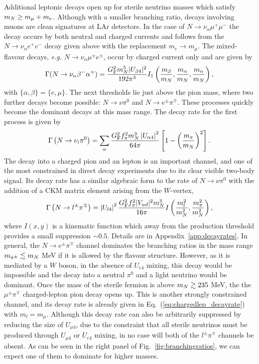 \documentclass[11pt, a4paper]{article}
\newcommand{\refeq}[1]{Eq.~(\ref{#1})}
\newcommand{\reffig}[1]{Fig.~\ref{#1}}
\newcommand{\refapp}[1]{Appendix~\ref{#1}}
\def\ster{\ensuremath N}
\begin{document}
Additional leptonic decays open up for sterile neutrino masses which satisfy
$m_\ster \geq m_\mu+m_e$. Although with a smaller branching ratio, decays
involving muons are clean signatures at LAr detectors. In the case of
$N\rightarrow \nu_\alpha \mu^+ \mu^-$ the decay occurs by both neutral and
charged currents and follows from the $N\rightarrow \nu_\alpha e^+ e^-$ decay
given above with the replacement $m_e \rightarrow m_\mu$.  The mixed-flavour
decays, \emph{e.g.} $N\rightarrow \nu_\alpha \mu^\pm e^\pm$, occur by charged
current only and are given by 
%
\[ \Gamma(\ster\to\nu_{\alpha} \beta^- \alpha^+) = \frac{G_\text{F}^2m_\ster^5
|U_{\beta 4}|^2}{192 \pi^3} I_1\left(\frac{m_\beta}{m_N},\frac{ m_\alpha}{m_N},
\frac{ m_\alpha}{m_N} \right) , \] 
%
with $\{\alpha,\beta\} = \{e, \mu\}$. The next thresholds lie just above the
pion mass, where two further decays become possible: $N\to\nu \pi^0$ and $N\to
e^\pm\pi^\mp$. These processes quickly become the dominant decays at this mass
range. 
%
The decay rate for the first process is given by
%
\[ \Gamma\left(\ster \to \nu_i \pi^0\right) = \sum_{\alpha}
\frac{G_\text{F}^2f_\pi^2m_\ster^3\left|U_{\alpha 4}\right|^2}{64\pi}
\left[1-\left(\frac{m_\pi}{m_\ster} \right)^2\right].  \]
%
The decay into a charged pion and an lepton is an important channel, and one of
the most constrained in direct decay experiments due to its clear visible
two-body signal. Its decay rate has a similar algebraic form to the rate of
$N\to \nu \pi^0$ with the addition of a CKM matrix element arising from the
$W$-vertex,
%
\begin{align} \Gamma\left(\ster\to l^\pm\pi^\mp\right) =
\left|U_{l4}\right|^2\frac{G_\text{F}^2f_\pi^2 |V_{ud}|^2
m_\ster^3}{16\pi}I\left(\frac{m_l^2}{m_\ster^2} ,
\frac{m_\pi^2}{m_\ster^2}\right) , \label{eq:chargedlep_decayrate}\end{align}
%
where $I(x,y)$ is a kinematic function which away from the production threshold
provides a small suppression $\sim 0.5$. Details are in
\refapp{app:decayrates}.
%
In general, the $N\to e^\pm\pi^\mp$ channel dominates the branching ratios in
the mass range $m_{\pi^\pm} \lesssim m_\ster$ MeV if it is allowed by the
flavour structure. However, as it is mediated by a $W$ boson, in the absence of
$U_{e4}$ mixing, this decay would be impossible and the decay into a neutral
$\pi^0$ and a light neutrino would be dominant. Once the mass of the sterile
fermion is above $m_\ster \gtrsim 235$ MeV, the the $\mu^\pm \pi^\mp$
charged-lepton pion decay opens up. This is another strongly constrained
channel, and its decay rate is already given in \refeq{eq:chargedlep_decayrate}
with $m_l = m_\mu$. Although this decay rate can also be arbitrarily suppressed
by reducing the size of $U_{\mu 4}$, due to the constraint that all sterile
neutrinos must be produced through $U_{\mu 4}$ or $U_{e4}$ mixing, in no case
will both of the $l^\pm\pi^\mp$ channels be absent. As can be seen in the
right panel of \reffig{fig:branchingratios}, we can expect one of them to
dominate for higher masses.
\end{document}
